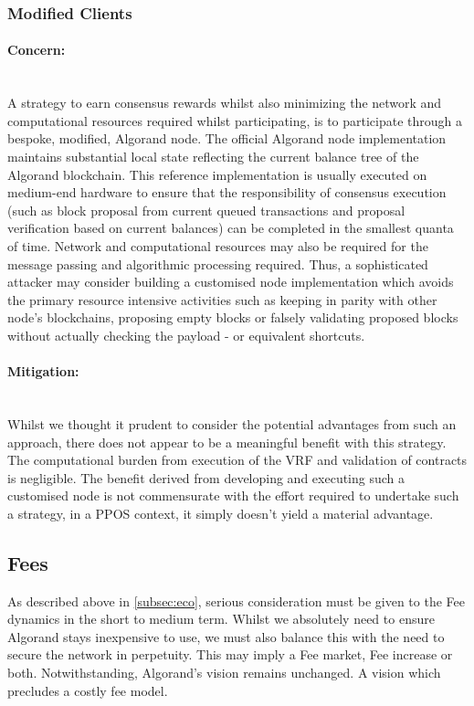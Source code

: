 \documentclass[11pt,a4paper]{article}
\begin{document}
\pagebreak

\subsubsection{Modified Clients}

\paragraph{Concern:} \mbox{}\\
A strategy to earn consensus rewards whilst also minimizing the network and computational resources required whilst 
participating, is to participate through a bespoke, modified, Algorand node. The official Algorand node implementation 
maintains substantial local state reflecting the current balance tree of the Algorand blockchain. This reference 
implementation is usually executed on medium-end hardware to ensure that the responsibility of consensus execution (such 
as block proposal from current queued transactions and proposal verification based on current balances) can be completed 
in the smallest quanta of time. Network and computational resources may also be required for the message passing and  
algorithmic processing required. Thus, a sophisticated attacker may consider building a customised node implementation 
which avoids the primary resource intensive activities such as keeping in parity with other node's blockchains, 
proposing empty blocks or falsely validating proposed blocks without actually checking the payload - or equivalent 
shortcuts. 

\paragraph{Mitigation:} \mbox{}\\
Whilst we thought it prudent to consider the potential advantages from such an approach, there does not appear to be a 
meaningful benefit with this strategy. The computational burden from execution of the VRF and validation of contracts 
is negligible. The benefit derived from developing and executing such a customised node is not commensurate with the 
effort required to undertake such a strategy, in a \gls{PPOS} context, it simply doesn't yield a material advantage. 

\pagebreak

\subsection{Fees}
As described above in \ref{subsec:eco}, serious consideration must be given to the Fee dynamics in the short to medium 
term. Whilst we absolutely need to ensure Algorand stays inexpensive to use, we must also balance this with the need to 
secure the network in perpetuity. This may imply a Fee market, Fee increase or both. Notwithstanding, Algorand's vision 
remains unchanged. A vision which precludes a costly fee model.
\end{document}
